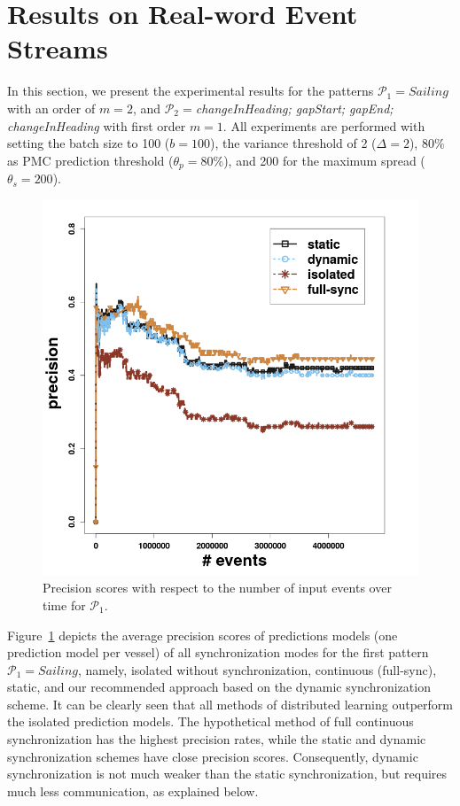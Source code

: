 \section{Results on Real-word Event Streams}
\label{sec:results_real}

In this section, we present the experimental results for the patterns  $\mathcal{P}_1=Sailing$ with an order of $m=2$, and   $\mathcal{P}_2=$\textit{changeInHeading; gapStart; gapEnd; changeInHeading} with first order $m=1$. All experiments are performed with setting the batch size to 100  ($b=100$), the variance threshold of 2 ($\Delta=2$), $80\%$ as PMC prediction threshold ($\theta_{p}=80\%$), and 200 for the maximum spread ($\theta_{s}=200$).

\begin{figure}[H]
	\centering
	\includegraphics[width=\textwidth,height=.62\textheight]{chapters/figures/synopses/p1_precision_100_2_08.png}
	
	\caption{Precision scores with respect to the number of input events over time for $\mathcal{P}_1$.}
	\label{fig:precsions}
\end{figure}

Figure~\ref{fig:precsions} depicts the average precision scores of predictions models (one prediction model per vessel) of all synchronization modes for the first pattern $\mathcal{P}_1=Sailing$, namely, isolated without synchronization, continuous (full-sync), static, and our recommended approach based on the dynamic synchronization scheme. It can be clearly seen that all methods of distributed learning outperform the isolated prediction models. The hypothetical method of full continuous synchronization has the highest precision rates, while the static and dynamic synchronization schemes have close precision scores. Consequently, dynamic synchronization is not much weaker than the static synchronization, but requires much less communication, as explained below.



